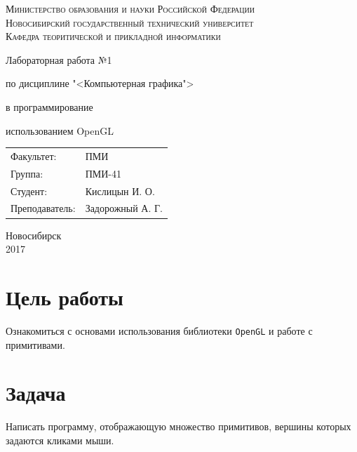 \documentclass[oneside, final, 10pt]{extarticle}
\begin{document}
\begin{titlepage}
	\begin{centering}
		\textsc{Министерство образования и науки Российской Федерации}\\
		\textsc{Новосибирский государственный технический университет}\\
		\textsc{Кафедра теоритической и прикладной информатики}\\
	\end{centering}
	\vfill
	\vfill
	\vfill
	\Large
	\centerline{Лабораторная работа №1}
	\centerline{по дисциплине "<Компьютерная графика">}
	\centerline{ в программирование}
	\centerline{ использованием OpenGL}
	\normalsize
	\vfill
	\vfill
	\vfill
	\begin{flushleft}
		\begin{minipage}{0.3\textwidth}
			\begin{tabular}{l l}
				Факультет: & ПМИ\\
				Группа: & ПМИ-41\\
				Студент: & Кислицын И. О.\\
				Преподаватель: & Задорожный А. Г.\\
			\end{tabular}
		\end{minipage}
	\end{flushleft}
	\vfill
	\vfill
	\begin{centering}
		Новосибирск\\
		2017\\
	\end{centering}
\end{titlepage}
\setcounter{page}{2}
\lstset{
	breaklines=\true,
	basicstyle=\footnotesize\ttfamily,
	tabsize=2,
	showspaces=\false,
	breaklines=\true,
	breakatwhitespace=\true,
	extendedchars=\true,
	keepspaces=\true
}
\section{Цель работы}

Ознакомиться с основами использования библиотеки \verb~OpenGL~ и работе с примитивами.

\section{Задача}

Написать программу, отображающую множество примитивов, вершины которых задаются кликами мыши.
\end{document}
